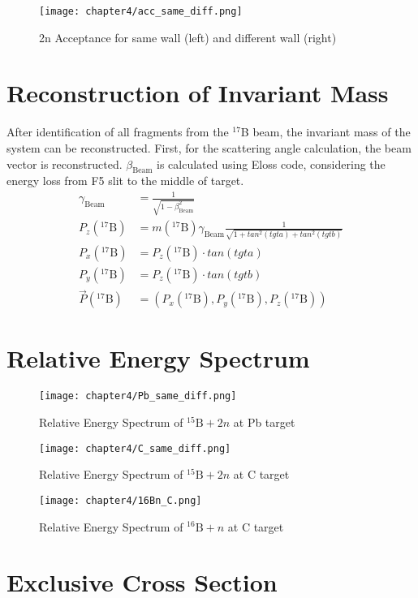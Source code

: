 \begin{figure}
    \centering
    \texttt{[image: chapter4/acc\_same\_diff.png]}
    \caption[$2n$ Acceptance for $E_{rel}$ and $\theta_{scat}$]{2n Acceptance for same wall (left) and different wall (right)}
\end{figure}


\section{Reconstruction of Invariant Mass}
After identification of all fragments from the ${}^{17}$B beam, the invariant mass of the system can be reconstructed. First, for the scattering angle calculation, the beam vector is reconstructed. $\beta_{\text{Beam}}$ is calculated using Eloss code, considering the energy loss from F5 slit to the middle of target.
\begin{align}
    \gamma_{\text{Beam}} &= \frac{1}{\sqrt{1-\beta_{\text{Beam}}^{2}}}\\
    P_z ({}^{17}\text{B}) &=  m({}^{17}\text{B}) \gamma_{\text{Beam}} \frac{1}{\sqrt{1+tan^2(tgta)+tan^2(tgtb)}}\\
    P_x ({}^{17}\text{B}) &=  P_z ({}^{17}\text{B}) \cdot tan(tgta)\\
    P_y ({}^{17}\text{B}) &=  P_z ({}^{17}\text{B}) \cdot tan(tgtb)\\
    \vec{P} ({}^{17}\text{B}) &= (P_x ({}^{17}\text{B}), P_y ({}^{17}\text{B}), P_z ({}^{17}\text{B}))
\end{align}


\section{Relative Energy Spectrum}
\begin{figure}
    \centering
    \texttt{[image: chapter4/Pb\_same\_diff.png]}
    \caption{Relative Energy Spectrum of ${}^{15}\text{B} + 2n$ at Pb target}
\end{figure}
\begin{figure}
    \centering
    \texttt{[image: chapter4/C\_same\_diff.png]}
    \caption{Relative Energy Spectrum of ${}^{15}\text{B} + 2n$ at C target}
\end{figure}

\begin{figure}
    \centering
    \texttt{[image: chapter4/16Bn\_C.png]}
    \caption{Relative Energy Spectrum of ${}^{16}\text{B} + n$ at C target}
\end{figure}



\section{Exclusive Cross Section}   